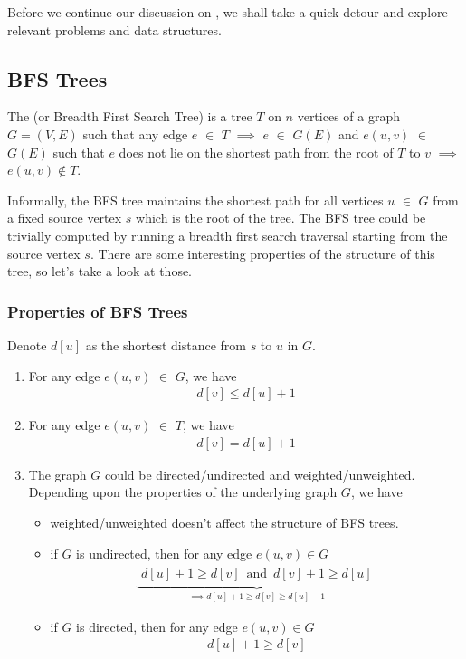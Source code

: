 Before we continue our discussion on , we shall take a quick detour and explore relevant problems and data structures.

\subsection{BFS Trees}
\begin{problem}
    The  (or Breadth First Search Tree) is a tree $T$ on $n$ vertices of a graph $G = (V, E)$ such that any edge $e$ $\in$ $T$ $\implies$ $e$ $\in$ $G(E)$ and $e(u, v)$ $\in$ $G(E)$ such that $e$ does not lie on the shortest path from the root of $T$ to $v$ $\implies$ $e(u, v) \not\in T$.
\end{problem}
Informally, the BFS tree maintains the shortest path for all vertices $u$ $\in$ $G$ from a fixed source vertex $s$ which is the root of the tree. The BFS tree could be trivially computed by running a breadth first search traversal starting from the source vertex $s$. There are some interesting properties of the structure of this tree, so let's take a look at those.

\subsubsection{Properties of BFS Trees}
Denote $d[u]$ as the shortest distance from $s$ to $u$ in $G$.
\begin{enumerate}
    \item For any edge $e(u, v)$ $\in$ $G$, we have 
    \begin{align*}
        d[v] \le d[u] + 1
    \end{align*}
    \item For any edge $e(u, v)$ $\in$ $T$, we have 
    \begin{align*}
        d[v] = d[u] + 1
    \end{align*}
    \item The graph $G$ could be directed/undirected and weighted/unweighted. Depending upon the properties of the underlying graph $G$, we have
    \begin{itemize}
        \item weighted/unweighted doesn't affect the structure of BFS trees.
        \item if $G$ is undirected, then for any edge $e(u, v) \in G$
        \begin{align*}
            \underbrace{
                \substack{
                    \displaystyle d[u] + 1 \geq d[v] \,\,\,\text{and}\,\,\, \displaystyle d[v] + 1 \geq d[u]
                }
            }_{\displaystyle \implies d[u] + 1 \geq d[v] \geq d[u] - 1}
        \end{align*}
        \item if $G$ is directed, then for any edge $e(u, v) \in G$
        \begin{align*}
            d[u] + 1 \geq d[v]
        \end{align*}
    \end{itemize}
\end{enumerate}

